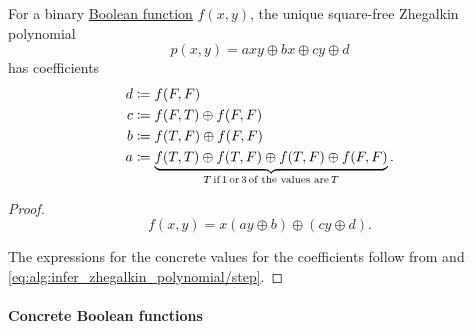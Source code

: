 \begin{proposition}\label{thm:binary_boolean_function_zhegalkin_polynomial}
  For a binary \hyperref[def:boolean_function]{Boolean function} \( f(x, y) \), the unique square-free Zhegalkin polynomial
  \begin{equation}\label{eq:thm:binary_boolean_function_zhegalkin_polynomial}
    p(x, y) = axy \oplus bx \oplus cy \oplus d
  \end{equation}
  has coefficients
  \begin{align*}
    d &\coloneqq f(F, F) \\
    c &\coloneqq f(F, T) \oplus f(F, F) \\
    b &\coloneqq f(T, F) \oplus f(F, F) \\
    a &\coloneqq \underbrace{f(T, T) \oplus f(T, F) \oplus f(T, F) \oplus f(F, F)}_{T \T*{if} 1 \T*{or} 3 \T*{of the values are} T}.
  \end{align*}
\end{proposition}
\begin{proof}
  \begin{equation*}
    f(x, y) = x(ay \oplus b) \oplus (cy \oplus d).
  \end{equation*}

  The expressions for the concrete values for the coefficients follow from  and \eqref{eq:alg:infer_zhegalkin_polynomial/step}.
\end{proof}

\paragraph{Concrete Boolean functions}

